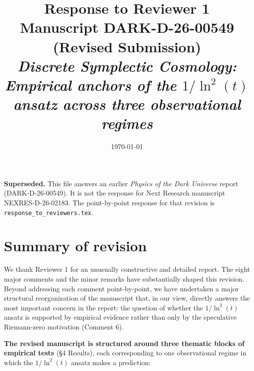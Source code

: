 \documentclass[12pt,a4paper]{article}
\title{Response to Reviewer 1\\
\large Manuscript DARK-D-26-00549 (Revised Submission)\\
\textit{Discrete Symplectic Cosmology: Empirical anchors of the $1/\ln^2(t)$ ansatz across three observational regimes}}
\author{}
\date{\today}
\begin{document}
\maketitle

\begin{center}
\textbf{Superseded.}
This file answers an earlier \emph{Physics of the Dark Universe} report (DARK-D-26-00549).
It is not the response for Next Research manuscript NEXRES-D-26-02183.
The point-by-point response for that revision is \texttt{response\_to\_reviewers.tex}.
\end{center}

\section*{Summary of revision}

We thank Reviewer 1 for an unusually constructive and detailed report.
The eight major comments and the minor remarks have substantially shaped this revision.
Beyond addressing each comment point-by-point, we have undertaken a major structural reorganization of the manuscript that, in our view, directly answers the most important concern in the report: the question of whether the $1/\ln^2(t)$ ansatz is supported by empirical evidence rather than only by the speculative Riemann-zero motivation (Comment 6).

\textbf{The revised manuscript is structured around three thematic blocks of empirical tests} (\S 4 Results), each corresponding to one observational regime in which the $1/\ln^2(t)$ ansatz makes a prediction:
\end{document}
